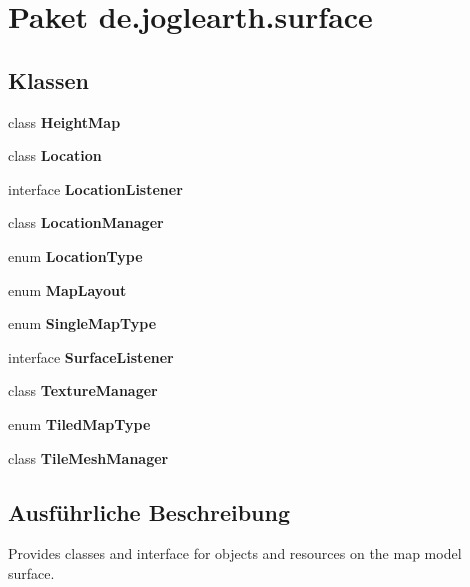 \section{Paket de.\-joglearth.\-surface}
\label{namespacede_1_1joglearth_1_1surface}
\subsection*{Klassen}
\begin{DoxyCompactItemize}
\item 
class {\bf Height\-Map}
\item 
class {\bf Location}
\item 
interface {\bf Location\-Listener}
\item 
class {\bf Location\-Manager}
\item 
enum {\bf Location\-Type}
\item 
enum {\bf Map\-Layout}
\item 
enum {\bf Single\-Map\-Type}
\item 
interface {\bf Surface\-Listener}
\item 
class {\bf Texture\-Manager}
\item 
enum {\bf Tiled\-Map\-Type}
\item 
class {\bf Tile\-Mesh\-Manager}
\end{DoxyCompactItemize}


\subsection{Ausführliche Beschreibung}
Provides classes and interface for objects and resources on the map model surface. 